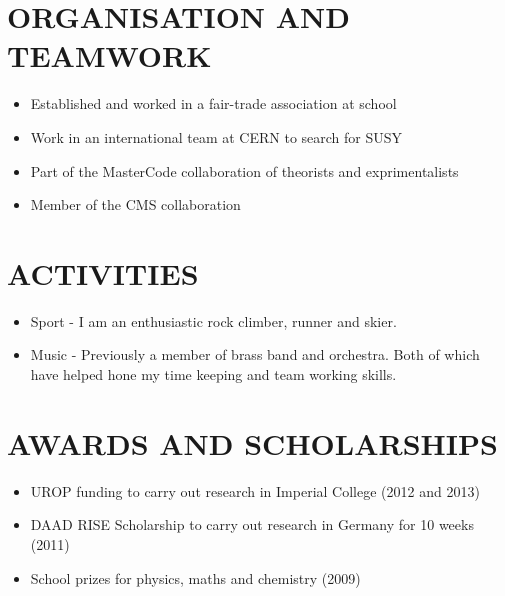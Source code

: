 \documentclass[9pt]{res} %
\begin{document}
\begin{resume}
\section{ORGANISATION AND TEAMWORK}
\begin{itemize}
   \item Established and worked in a fair-trade association at school
   \item Work in an international team at CERN to search for SUSY 
   \item Part of the MasterCode collaboration of theorists and exprimentalists
   \item Member of the CMS collaboration 
\end{itemize}

\section{ACTIVITIES} 
\begin{itemize}
\item Sport - I am an enthusiastic rock climber, runner and skier.
\item Music - Previously a member of brass band and orchestra. Both of which have helped hone my time keeping and team working skills.
\end{itemize}

\section{AWARDS AND SCHOLARSHIPS}
\begin{itemize}
\item UROP funding to carry out research in Imperial College (2012 and 2013)
\item DAAD RISE Scholarship to carry out research in Germany for 10 weeks (2011)
\item School prizes for physics, maths and chemistry (2009)
\end{itemize}


\end{resume}
\end{document}
